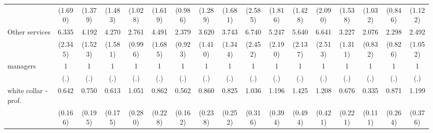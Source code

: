 {\begin{tabular}{l*{16}{c}}
                    &     (1.690)         &     (1.379)         &     (1.483)         &     (1.028)         &     (1.619)         &     (0.986)         &     (1.289)         &     (1.681)         &     (2.585)         &     (1.816)         &     (1.428)         &     (2.090)         &     (1.538)         &     (1.032)         &     (0.846)         &     (1.122)         \\
[1em]
Other services      &       6.335\sym{***}&       4.192\sym{***}&       4.270\sym{***}&       2.761\sym{**} &       4.491\sym{***}&       2.379\sym{*}  &       3.620\sym{***}&       3.743\sym{***}&       6.740\sym{***}&       5.247\sym{***}&       5.640\sym{***}&       6.641\sym{***}&       3.227\sym{**} &       2.076         &       2.298\sym{*}  &       2.492\sym{*}  \\
                    &     (2.345)         &     (1.523)         &     (1.581)         &     (0.996)         &     (1.685)         &     (0.923)         &     (1.410)         &     (1.344)         &     (2.452)         &     (2.190)         &     (2.137)         &     (2.513)         &     (1.311)         &     (0.832)         &     (0.826)         &     (1.052)         \\
[1em]
managers            &           1         &           1         &           1         &           1         &           1         &           1         &           1         &           1         &           1         &           1         &           1         &           1         &           1         &           1         &           1         &           1         \\
                    &         (.)         &         (.)         &         (.)         &         (.)         &         (.)         &         (.)         &         (.)         &         (.)         &         (.)         &         (.)         &         (.)         &         (.)         &         (.)         &         (.)         &         (.)         &         (.)         \\
[1em]
white collar - prof.&       0.642         &       0.750         &       0.613         &       1.051         &       0.862         &       0.562\sym{*}  &       0.860         &       0.825         &       1.036         &       1.196         &       1.425         &       1.208         &       0.676         &       0.335\sym{***}&       0.871         &       1.199         \\
                    &     (0.166)         &     (0.195)         &     (0.175)         &     (0.280)         &     (0.228)         &     (0.162)         &     (0.238)         &     (0.252)         &     (0.316)         &     (0.394)         &     (0.494)         &     (0.421)         &     (0.221)         &     (0.111)         &     (0.264)         &     (0.376)         \\

\end{tabular}}
